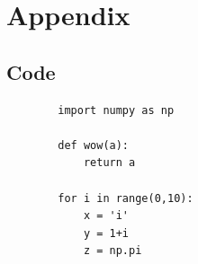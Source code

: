 \documentclass[12pt]{article}
\begin{document}
\listoffigures

\listoftables

\newpage

\section*{Appendix} \label{sec:A}

\subsection*{Code}

\begin{center}

\begin{mintedbox}
    \begin{verbatim}
        import numpy as np

        def wow(a):
            return a

        for i in range(0,10):
            x = 'i'
            y = 1+i
            z = np.pi
    \end{verbatim}
\end{mintedbox}

\end{center}
\end{document}
